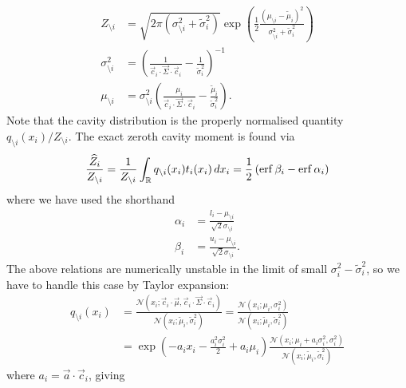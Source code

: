 \documentclass[11pt,twoside]{report}
\begin{document}
\begin{align}
  Z_{\setminus i}
  &=
  \sqrt{2 \pi (\sigma_{\setminus i}^2 + \widetilde{\sigma}_i^2)}
  \exp{\left(
    \frac{1}{2}
    \frac{(\mu_{\setminus i} - \widetilde{\mu}_i)^2}{\sigma_{\setminus i}^2 + \widetilde{\sigma}_i^2}
    \right)}
        \\
  \sigma_{\setminus i}^2 &= \left(
  \frac{1}{\vec{c}_i \cdot \vec{\Sigma} \cdot \vec{c}_i} - \frac{1}{\widetilde{\sigma}_i^2}
  \right)^{-1} \\
  \mu_{\setminus i} &= \sigma_{\setminus i}^2 \left(
  \frac{\mu_i}{\vec{c}_i \cdot \vec{\Sigma} \cdot \vec{c}_i} - \frac{\widetilde{\mu}_i}{\widetilde{\sigma}_i^2}
  \right).
\end{align}
Note that the cavity distribution is the properly normalised quantity $q_{\setminus i}(x_i) / Z_{\setminus i}$.
The exact zeroth cavity moment is found via \cite{Cunningham2011}
\begin{equation}\label{eq:exact-zeroth-moment}
  \frac{\widehat{Z}_i}{Z_{\setminus i}} =
  \frac{1}{Z_{\setminus i}}
  \int_{\mathbb{R}} q_{\setminus i}(x_i) t_i(x_i) \, dx_i
  = \frac{1}{2} \left( \operatorname{erf}{\beta_i} - \operatorname{erf}{\alpha_i} \right)
\end{equation}
where we have used the shorthand
\begin{align}
  \alpha_i &= \frac{l_i - \mu_{\setminus i}}{\sqrt{2} \sigma_{\setminus i}} \\
  \beta_i &= \frac{u_i - \mu_{\setminus i}}{\sqrt{2} \sigma_{\setminus i}}.
\end{align}
The above relations are numerically unstable in the limit of small $\sigma_i^2 - \widetilde{\sigma}_i^2$, so we have to handle this case by Taylor expansion:
\begin{align}
  q_{\setminus i}(x_i) &=
  \frac{
    \mathcal{N}(x_i; \vec{c}_i \cdot \vec{\mu}, \vec{c}_i \cdot \vec{\Sigma} \cdot \vec{c}_i)
  }{
    \mathcal{N}(x_i; \widetilde{\mu}_i, \widetilde{\sigma}_i^2)
  }
  =
  \frac{\mathcal{N}(x_i; \mu_i, \sigma_i^2)}{
    \mathcal{N}(x_i; \widetilde{\mu}_i, \widetilde{\sigma}_i^2)
  }
  \nonumber \\ &=
  \exp{\left(-a_i x_i
    - \frac{a_i^2 \sigma_i^2}{2}
    + a_i \mu_i
    \right)}
  \frac{\mathcal{N}(x_i; \mu_i + a_i \sigma_i^2, \sigma_i^2)}{
    \mathcal{N}(x_i; \widetilde{\mu}_i, \widetilde{\sigma}_i^2)
  }
\end{align}
where $a_i = \vec{a} \cdot \vec{c}_i$, giving
\end{document}
